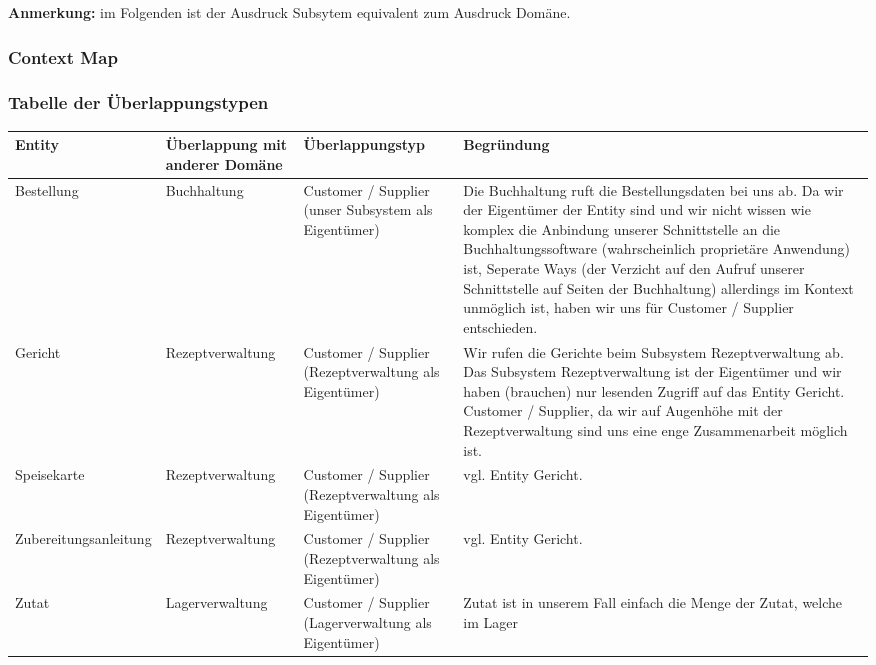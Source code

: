 \textbf{Anmerkung:} im Folgenden ist der Ausdruck Subsytem
equivalent zum Ausdruck Dom\"ane.

\subsubsection{Context Map}


\newpage

\subsubsection{Tabelle der \"Uberlappungstypen}

\begin{longtabu} to 
\hline{}
Entity &\"Uberlappung mit anderer Dom\"ane
  &\"Uberlappungstyp &Begr\"undung \\
\hline
Bestellung &Buchhaltung &Customer / Supplier (unser
  Subsystem als Eigent\"umer) &Die Buchhaltung ruft die
  Bestellungsdaten bei uns ab. Da wir der Eigent\"umer der
  Entity sind und wir nicht wissen wie komplex die Anbindung
  unserer Schnittstelle an die Buchhaltungssoftware
  (wahrscheinlich propriet\"are Anwendung) ist, Seperate
  Ways (der Verzicht auf den Aufruf unserer Schnittstelle
  auf Seiten der Buchhaltung) allerdings im Kontext
  unm\"oglich ist, haben wir uns f\"ur Customer / Supplier
  entschieden. \\
\hline
Gericht &Rezeptver\-waltung &Customer / Supplier
  (Rezeptverwaltung als Eigent\"umer) &Wir rufen
  die Gerichte beim Subsystem Rezeptverwaltung ab. Das
  Subsystem Rezeptverwaltung ist der Eigent\"umer und wir
  haben (brauchen) nur lesenden Zugriff auf das Entity
  Gericht. Customer / Supplier, da wir auf Augenh\"ohe mit
  der Rezeptverwaltung sind uns eine enge Zusammenarbeit
  m\"oglich ist. \\
\hline
Speisekar\-te &Rezeptver\-waltung &Customer / Supplier
  (Rezeptverwaltung als Eigent\"umer) &vgl. Entity Gericht.
  \\
\hline
Zuberei\-tungsanlei\-tung &Rezeptver\-waltung &
  Customer / Supplier (Rezeptverwaltung als Eigent\"umer)
  &vgl. Entity Gericht. \\
\hline
Zutat &Lagerver\-waltung &Customer / Supplier
  (Lagerverwaltung als Eigent\"umer) &Zutat ist in unserem
  Fall einfach die Menge der Zutat, welche im Lager

\end{longtabu}
